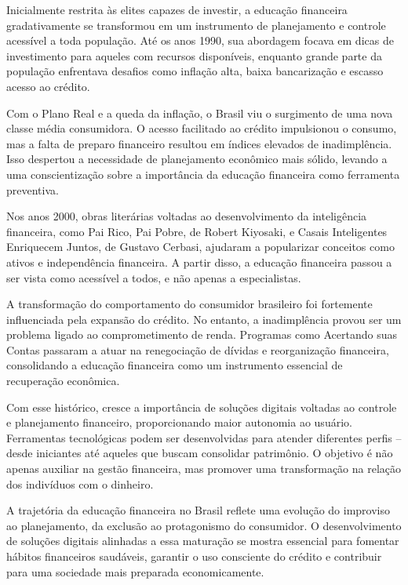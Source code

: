 \documentclass[
	article,			%
	12pt,				%
	oneside,			%
	a4paper,			%
	english,			%
	brazil,				%
	sumario=tradicional
	]{abntex2}
\begin{document}
Inicialmente restrita às elites capazes de investir, a educação financeira gradativamente se transformou em um instrumento de planejamento e controle acessível a toda população. Até os anos 1990, sua abordagem focava em dicas de investimento para aqueles com recursos disponíveis, enquanto grande parte da população enfrentava desafios como inflação alta, baixa bancarização e escasso acesso ao crédito.

Com o Plano Real e a queda da inflação, o Brasil viu o surgimento de uma nova classe média consumidora. O acesso facilitado ao crédito impulsionou o consumo, mas a falta de preparo financeiro resultou em índices elevados de inadimplência. Isso despertou a necessidade de planejamento econômico mais sólido, levando a uma conscientização sobre a importância da educação financeira como ferramenta preventiva.

Nos anos 2000, obras literárias voltadas ao desenvolvimento da inteligência financeira, como Pai Rico, Pai Pobre, de Robert Kiyosaki, e Casais Inteligentes Enriquecem Juntos, de Gustavo Cerbasi, ajudaram a popularizar conceitos como ativos e independência financeira. A partir disso, a educação financeira passou a ser vista como acessível a todos, e não apenas a especialistas.

A transformação do comportamento do consumidor brasileiro foi fortemente influenciada pela expansão do crédito. No entanto, a inadimplência provou ser um problema ligado ao comprometimento de renda. Programas como Acertando suas Contas passaram a atuar na renegociação de dívidas e reorganização financeira, consolidando a educação financeira como um instrumento essencial de recuperação econômica.

Com esse histórico, cresce a importância de soluções digitais voltadas ao controle e planejamento financeiro, proporcionando maior autonomia ao usuário. Ferramentas tecnológicas podem ser desenvolvidas para atender diferentes perfis – desde iniciantes até aqueles que buscam consolidar patrimônio. O objetivo é não apenas auxiliar na gestão financeira, mas promover uma transformação na relação dos indivíduos com o dinheiro.

    A trajetória da educação financeira no Brasil reflete uma evolução do improviso ao planejamento, da exclusão ao protagonismo do consumidor. O desenvolvimento de soluções digitais alinhadas a essa maturação se mostra essencial para fomentar hábitos financeiros saudáveis, garantir o uso consciente do crédito e contribuir para uma sociedade mais preparada economicamente.
\end{document}
